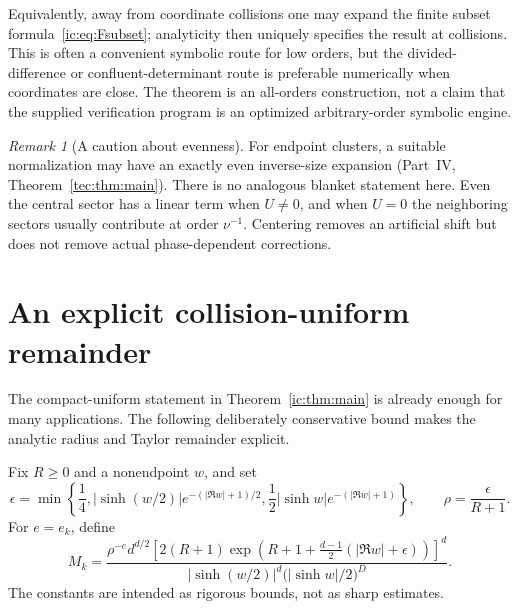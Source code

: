 \documentclass[11pt,a4paper]{article}
\numberwithin{equation}{section}
\theoremstyle{definition}
\theoremstyle{remark}
\newtheorem{remark}[theorem]{Remark}
\begin{document}
Equivalently, away from coordinate collisions one may expand the
finite subset formula~\eqref{ic:eq:Fsubset}; analyticity then uniquely
specifies the result at collisions. This is often a convenient symbolic
route for low orders, but the divided-difference or confluent-determinant
route is preferable numerically when coordinates are close. The theorem
is an all-orders construction, not a claim that the supplied verification
program is an optimized arbitrary-order symbolic engine.

\begin{remark}[A caution about evenness]
For endpoint clusters, a suitable normalization may have an exactly even
inverse-size expansion (Part~IV, Theorem~\ref{tec:thm:main}). There is no analogous blanket
statement here. Even the central sector has a linear term when $U\ne0$,
and when $U=0$ the neighboring sectors usually contribute at order
$\nu^{-1}$. Centering removes an artificial shift but does not remove
actual phase-dependent corrections.
\end{remark}

\section{An explicit collision-uniform remainder}\label{ic:sec:bound}
The compact-uniform statement in Theorem~\ref{ic:thm:main} is already enough
for many applications. The following deliberately conservative bound
makes the analytic radius and Taylor remainder explicit.

Fix $R\ge0$ and a nonendpoint $w$, and set
\begin{equation}\label{ic:eq:epsilon}
 \epsilon=\min\left\{\frac14,
  |\sinh(w/2)|e^{-(|\Re w|+1)/2},
  \frac12|\sinh w|e^{-(|\Re w|+1)}\right\},
 \qquad \rho=\frac{\epsilon}{R+1}.
\end{equation}
For $e=e_k$, define
\begin{equation}\label{ic:eq:Mbound}
 M_k=\frac{\rho^{-e}d^{d/2}
 \left[2(R+1)\exp\left(R+1+\frac{d-1}{2}(|\Re w|+\epsilon)\right)\right]^d}
 {|\sinh(w/2)|^d\bigl(|\sinh w|/2\bigr)^D}.
\end{equation}
The constants are intended as rigorous bounds, not as sharp estimates.
\end{document}
